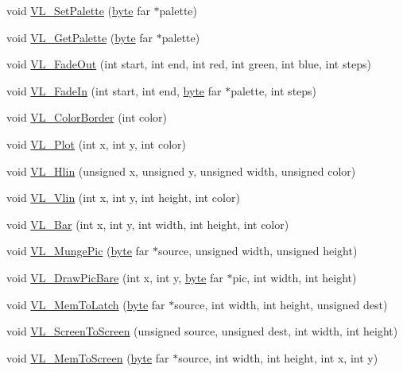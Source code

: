 \begin{DoxyCompactItemize}
\item 
void \hyperlink{ID__VL_8H_ae2508644c57749de78a11a9122a36157}{VL\_\-SetPalette} (\hyperlink{ID__HEAD_8H_a0c8186d9b9b7880309c27230bbb5e69d}{byte} far $\ast$palette)
\item 
void \hyperlink{ID__VL_8H_a9bcb5eb78f4668f31cc3ebcaec2d8e1b}{VL\_\-GetPalette} (\hyperlink{ID__HEAD_8H_a0c8186d9b9b7880309c27230bbb5e69d}{byte} far $\ast$palette)
\item 
void \hyperlink{ID__VL_8H_a03069f779ef1392c1d130618114c8783}{VL\_\-FadeOut} (int start, int end, int red, int green, int blue, int steps)
\item 
void \hyperlink{ID__VL_8H_a2f911632b5e47f727e64787b40e8781b}{VL\_\-FadeIn} (int start, int end, \hyperlink{ID__HEAD_8H_a0c8186d9b9b7880309c27230bbb5e69d}{byte} far $\ast$palette, int steps)
\item 
void \hyperlink{ID__VL_8H_a894ae8ddb88f5bcd4a18fe7082a441e4}{VL\_\-ColorBorder} (int color)
\item 
void \hyperlink{ID__VL_8H_af6832bc9cfe83972291dcb2d9143fbe6}{VL\_\-Plot} (int x, int y, int color)
\item 
void \hyperlink{ID__VL_8H_a0e9e36346595a9d3080888a54e9bab32}{VL\_\-Hlin} (unsigned x, unsigned y, unsigned width, unsigned color)
\item 
void \hyperlink{ID__VL_8H_add1ee903f12ff9e8c9c9baff950abcdd}{VL\_\-Vlin} (int x, int y, int height, int color)
\item 
void \hyperlink{ID__VL_8H_ae4d749f6bd2e011c5ef11165d2f2b433}{VL\_\-Bar} (int x, int y, int width, int height, int color)
\item 
void \hyperlink{ID__VL_8H_a3d96886ea2eea0773d12d9c494ecd8dc}{VL\_\-MungePic} (\hyperlink{ID__HEAD_8H_a0c8186d9b9b7880309c27230bbb5e69d}{byte} far $\ast$source, unsigned width, unsigned height)
\item 
void \hyperlink{ID__VL_8H_a82eb4a80d471875dc797a043f396c5c3}{VL\_\-DrawPicBare} (int x, int y, \hyperlink{ID__HEAD_8H_a0c8186d9b9b7880309c27230bbb5e69d}{byte} far $\ast$pic, int width, int height)
\item 
void \hyperlink{ID__VL_8H_aa3a8bd4100a1d27c2680fa2799536ca7}{VL\_\-MemToLatch} (\hyperlink{ID__HEAD_8H_a0c8186d9b9b7880309c27230bbb5e69d}{byte} far $\ast$source, int width, int height, unsigned dest)
\item 
void \hyperlink{ID__VL_8H_a68ee1720082840fed0f036f627d308fd}{VL\_\-ScreenToScreen} (unsigned source, unsigned dest, int width, int height)
\item 
void \hyperlink{ID__VL_8H_a9395a541fc6c21a2d7e7d8b4932d134e}{VL\_\-MemToScreen} (\hyperlink{ID__HEAD_8H_a0c8186d9b9b7880309c27230bbb5e69d}{byte} far $\ast$source, int width, int height, int x, int y)

\end{DoxyCompactItemize}
